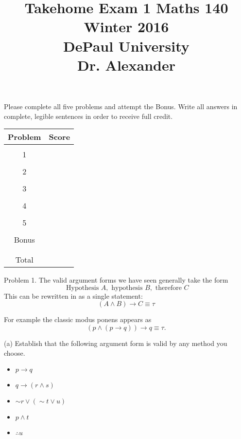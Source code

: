 \documentclass[16 pt]{amsart}
\theoremstyle{definition}
\theoremstyle{remark}
\numberwithin{equation}{subsection}
\begin{document}
\title{Takehome Exam 1 Maths 140 Winter 2016 \\ DePaul University\\Dr. Alexander}
\maketitle
Please complete all five problems and attempt the Bonus.  Write all answers in complete, legible sentences in order to receive full credit.
\vspace{1in}


\begin{center}
  \begin{tabular}{ c | c }
    Problem & Score\\
    \hline
    &\\
    1&\\
    &\\
    2&\\
    &\\
    3&\\
    &\\
    4&\\
    &\\
    5&\\
    &\\
    Bonus&\\
    &\\
    \hline 
    &\\    
    Total& 
 \end{tabular}
\end{center}

\newpage 
Problem 1. The valid argument forms we have seen generally take the form
\[
\text{ Hypothesis } A, \text{ hypothesis } B, \text{ therefore } C
\]
This can be rewritten in as a single statement:
\[
(A\wedge B) \rightarrow C \equiv \tau
\]

For example the classic modus ponens appears as
\[
(p \wedge(p\rightarrow q)) \rightarrow q \equiv \tau.
\]

(a) Establish that the following argument form is valid by any method you choose.
\begin{itemize}
\item[] $p\rightarrow q$\\
\item[] $q \rightarrow (r \wedge s)$\\
\item[] $\sim r \vee (\sim t \vee u)$\\
\item[] $p\wedge t$\\
\item[] $\therefore u$
\end{itemize}
 
\end{document}

